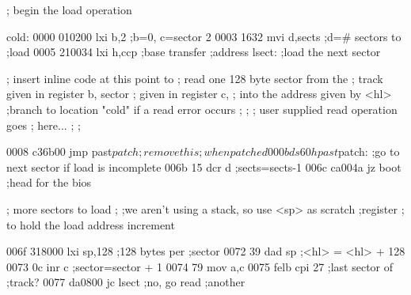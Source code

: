                                   ;         begin the load operation

                                  cold:
0000 010200                                 lxi  b,2               ;b=0, c=sector 2
0003 1632                                   mvi  d,sects           ;d=# sectors to
                                                                   ;load
0005 210034                                 lxi  h,ccp             ;base transfer
                                                                   ;address
                                  lsect:    ;load the next sector

                                  ;         insert inline code at this point to
                                  ;         read one 128 byte sector from the
                                  ;         track given in register b, sector
                                  ;         given in register c,
                                  ;         into the address given by <hl>
                                  ;branch to location "cold" if a read error occurs
                                  ;
                                  ;
                                  ;              user supplied read operation goes
                                  ;              here...
                                  ;
                                  ;

0008 c36b00                                 jmp past$patch         ;remove this
                                                                   ;when patched
000b                                        ds   60h

                                  past$patch:
                                  ;go to next sector if load is incomplete
006b 15                                     dcr  d                 ;sects=sects-1
006c ca004a                                 jz   boot              ;head for the bios

                                  ;         more sectors to load
                                  ;
                                  ;we aren't using a stack, so use <sp> as scratch
                                  ;register
                                  ;         to hold the load address increment

006f 318000                                 lxi  sp,128            ;128 bytes per
                                                                   ;sector
0072 39                                     dad  sp                ;<hl> = <hl> +
                                                                   128
0073 0c                                     inr  c                 ;sector=sector + 1
0074 79                                     mov  a,c 
0075 felb                                   cpi  27                ;last sector of
                                                                   ;track?
0077 da0800                                 jc   lsect             ;no, go read
                                                                   ;another

